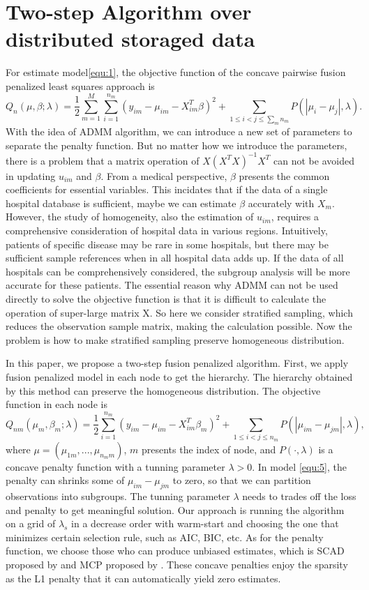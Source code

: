 \documentclass[review]{elsarticle}
\begin{document}
\section{Two-step Algorithm over distributed storaged data}\label{sec:2}
For estimate model\ref{equ:1}, the objective function of the concave pairwise fusion penalized least squares
approach is
$$
Q_n(\mu, \beta;\lambda) = \frac{1}{2}\sum_{m=1}^M\sum_{i=1}^{n_m}(y_{im}-\mu_{im}-X_{im}^T\beta)^2+\sum_{1\leq i<j\leq \sum_m{n_m}}P(|\mu_{i}-\mu_{j}|,\lambda).
$$
With the idea of ADMM algorithm, we can introduce a new set of parameters to separate the penalty function. But no matter how we introduce the parameters, there is a problem that a matrix operation of $X(X^TX)^{-1}X^T$ can not be avoided in updating $u_{im}$ and $\beta$. From a medical perspective, $\beta$ presents the common coefficients for essential variables. This incidates that if the data of a single hospital database is sufficient, maybe we can estimate $\beta$ accurately with $X_m$. However, the study of homogeneity, also the estimation of $u_{im}$, requires a comprehensive consideration of hospital data in various regions. Intuitively, patients of specific disease may be rare in some hospitals, but there may be sufficient sample references when in all hospital data adds up. If the data of all hospitals can be comprehensively considered, the subgroup analysis will be more accurate for these patients. The essential reason why ADMM can not be used directly to solve the objective function is that it is difficult to calculate the operation of super-large matrix X. So here we consider stratified sampling, which reduces the observation sample matrix, making the calculation possible. Now the problem is how to make stratified sampling preserve homogeneous distribution.

In this paper, we propose a two-step fusion penalized algorithm. First, we apply fusion penalized model in each node to get the hierarchy. The hierarchy obtained by this method can preserve the homogeneous distribution. The objective function in each node is
\begin{equation}
\label{equ:5}
Q_{nm}(\mu_m, \beta_m;\lambda) = \frac{1}{2}\sum_{i=1}^{n_m}(y_{im}-\mu_{im}-X_{im}^T\beta_m)^2+\sum_{1\leq i<j\leq n_m}P(|\mu_{im}-\mu_{jm}|,\lambda),
\end{equation}
where $\mu=(\mu_{1m},...,\mu_{n_mm})$, $m$ presents the index of node, and $P(\cdot,\lambda)$ is a concave penalty function with a tunning parameter $\lambda>0$. In model \ref{equ:5}, the penalty can shrinks some of $\mu_{im}-\mu_{jm}$ to zero, so that we can partition observations into subgroups. The tunning parameter $\lambda$ needs to trades off the loss and penalty to get meaningful solution. Our approach is running the algorithm on a grid of $\lambda_s$ in a decrease order with warm-start and choosing the one that minimizes certain selection rule, such as AIC, BIC, etc. As for the penalty function, we choose those who can produce unbiased estimates, which is SCAD proposed by \cite{fan2001variable} and MCP proposed by \cite{zhang2010nearly}. These concave penalties
enjoy the sparsity as the L1 penalty that it can automatically yield zero estimates.
\end{document}
